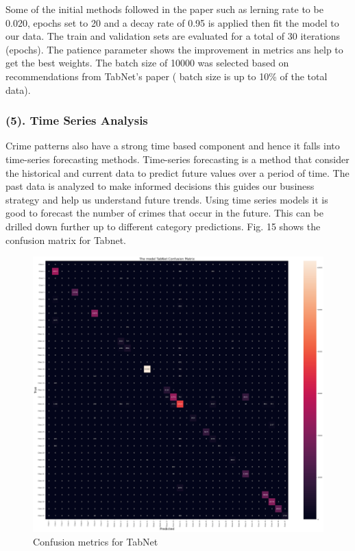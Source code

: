 \documentclass[10 pt,conference,final,]{IEEEtran}
\begin{document}
Some of the initial methods followed in the paper such as lerning rate
to be 0.020, epochs set to 20 and a decay rate of 0.95 is applied then
fit the model to our data. The train and validation sets are evaluated
for a total of 30 iterations (epochs). The patience parameter shows the
improvement in metrics ans help to get the best weights. The batch size
of 10000 was selected based on recommendations from TabNet's paper (
batch size is up to 10\% of the total data).

\subsubsection{(5). Time Series Analysis}\label{time-series-analysis}

Crime patterns also have a strong time based component and hence it
falls into time-series forecasting methods. Time-series forecasting is a
method that consider the historical and current data to predict future
values over a period of time. The past data is analyzed to make informed
decisions this guides our business strategy and help us understand
future trends. Using time series models it is good to forecast the
number of crimes that occur in the future. This can be drilled down
further up to different category predictions. Fig. 15 shows the
confusion matrix for Tabnet.

\begin{figure}

{\centering \includegraphics[width=0.9\linewidth]{img/TabNet} 

}

\caption{Confusion metrics for TabNet}\label{fig:unnamed-chunk-15}
\end{figure}
\end{document}
